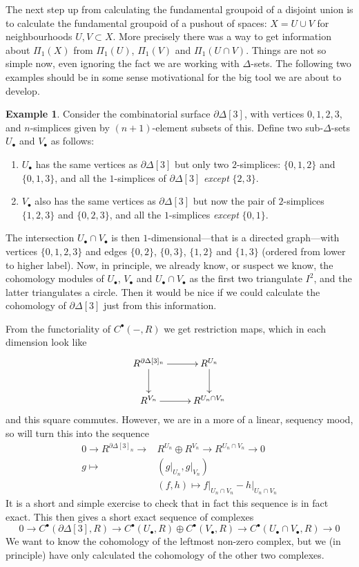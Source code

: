 \documentclass{tufte-handout}
\theoremstyle{definition}
\newtheorem{example}{Example}
\begin{document}
The next step up from calculating the fundamental groupoid of a disjoint union is to calculate
the fundamental groupoid of a pushout of spaces: $X = U\cup V$ for neighbourhoods $U,V\subset X$.
More precisely there was a way to get information about $\Pi_1(X)$ from $\Pi_1(U)$, $\Pi_1(V)$ 
and $\Pi_1(U\cap V)$. Things are not so simple now, even ignoring the fact we are working 
with $\Delta$-sets. The following two examples should be in some sense motivational for the 
big tool we are about to develop. 

\begin{example}
Consider the combinatorial surface $\partial\Delta[3]$, with vertices $0,1,2,3$, and 
$n$-simplices given by $(n+1)$-element subsets of this.
Define two sub-$\Delta$-sets $U_\bullet$ and $V_\bullet$ as follows:
\begin{enumerate}
\item $U_\bullet$ has the same vertices as $\partial\Delta[3]$ but only two $2$-simplices: 
$\{0,1,2\}$ and $\{0,1,3\}$, and all the $1$-simplices of $\partial \Delta[3]$ \emph{except}
$\{2,3\}$.
\item $V_\bullet$ also has the same vertices as $\partial\Delta[3]$ but now the pair of $2$-simplices
$\{1,2,3\}$ and $\{0,2,3\}$, and all the $1$-simplices \emph{except} $\{0,1\}$.
\end{enumerate}
The 
intersection $U_\bullet\cap V_\bullet$ is then $1$-dimensional---that is a directed graph---with 
vertices $\{0,1,2,3\}$ and edges $\{0,2\}$, $\{0,3\}$, $\{1,2\}$ and $\{1,3\}$ (ordered from
lower to higher label). Now, in principle,
we already know, or suspect we know, the cohomology modules of $U_\bullet$, $V_\bullet$ and 
$U_\bullet\cap V_\bullet$ as the first two triangulate $I^2$, and the latter triangulates a 
circle. Then it would be nice if we could calculate the cohomology of $\partial\Delta[3]$ just
from this information.

From the functoriality of $C^\bullet(-,R)$ we get restriction maps, which in each dimension 
look like
\[
	\xymatrix{
		R^{\partial\Delta[3]_n} \ar[r] \ar[d] & R^{U_n} \ar[d]\\
		R^{V_n} \ar[r] & R^{U_n\cap V_n}
	}
\]
and this square commutes. However, we are in a more of a linear, sequency mood, so will turn
this into the sequence
\begin{align*}
	0\to R^{\partial\Delta[3]_n} \to & R^{U_n}\oplus R^{V_n} \to R^{U_n\cap V_n}\to 0\\
	g\mapsto & (g\big|_{U_n},g\big|_{V_n})\\
		& (f,h) \mapsto f\big|_{U_n\cap V_n} - h\big|_{U_n\cap V_n}
\end{align*}
It is a short and simple exercise to check that in fact this sequence is in fact exact. This then
gives a short exact sequence of complexes
\[
0\to C^\bullet(\partial\Delta[3],R) \to C^\bullet(U_\bullet,R) \oplus C^\bullet(V_\bullet,R) \to C^\bullet(U_\bullet\cap V_\bullet,R) \to 0
\]
We want to know the cohomology of the leftmost non-zero complex, but we (in principle) have
only calculated the cohomology of the other two complexes.
\end{example}
\end{document}
